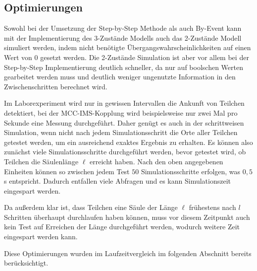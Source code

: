 % 
% 

\subsection{Optimierungen}
Sowohl bei der Umsetzung der Step-by-Step Methode als auch By-Event kann mit der Implementierung des 3-Zustände Modells auch das 2-Zustände Modell simuliert werden, indem nicht benötigte Übergangswahrscheinlichkeiten auf einen Wert von $0$ gesetzt werden. Die 2-Zustände Simulation ist aber vor allem bei der Step-by-Step Implementierung deutlich schneller, da nur auf boolschen Werten gearbeitet werden muss und deutlich weniger ungenutzte Information in den Zwischenschritten berechnet wird.

Im Laborexperiment wird nur in gewissen Intervallen die Ankunft von Teilchen detektiert, bei der MCC-IMS-Kopplung wird beispielsweise nur zwei Mal pro Sekunde eine Messung durchgeführt. Daher genügt es auch in der schrittweisen Simulation, wenn nicht nach jedem Simulationsschritt die Orte aller Teilchen getestet werden, um ein ausreichend exaktes Ergebnis zu erhalten.
Es können also zunächst viele Simulationsschritte durchgeführt werden, bevor getestet wird, ob Teilchen die Säulenlänge $\ell$ erreicht haben. Nach den oben angegebenen Einheiten können so zwischen jedem Test $50$ Simulationsschritte erfolgen, was $0,5$s entspricht. Dadurch entfallen viele Abfragen und es kann Simulationszeit eingespart werden. 

Da außerdem klar ist, dass Teilchen eine Säule der Länge $\ell$ frühestens nach $l$ Schritten überhaupt durchlaufen haben können, muss vor diesem Zeitpunkt auch kein Test auf Erreichen der Länge durchgeführt werden, wodurch weitere Zeit eingespart werden kann.

Diese Optimierungen wurden im Laufzeitvergleich im folgenden Abschnitt bereits berücksichtigt.

